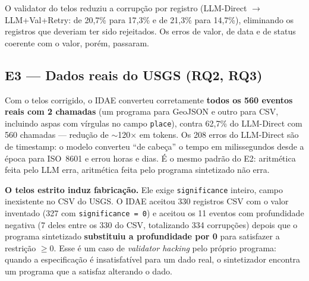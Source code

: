 \documentclass[sigconf,nonacm]{acmart}
\begin{document}
O validator do telos reduziu a corrupção por registro (LLM-Direct $\to$ LLM+Val+Retry: de 20,7\% para 17,3\% e de 21,3\% para 14,7\%), eliminando os registros que deveriam ter sido rejeitados. Os erros de valor, de data e de status coerente com o valor, porém, passaram.

\subsection{E3 --- Dados reais do USGS (RQ2, RQ3)}

\begin{table}[h]
\caption{E3 --- 560 eventos reais do USGS (Opus 4.5)}
\label{tab:e3}
\end{table}

Com o telos corrigido, o IDAE converteu corretamente \textbf{todos os 560 eventos reais com 2 chamadas} (um programa para GeoJSON e outro para CSV, incluindo aspas com vírgulas no campo \texttt{place}), contra 62,7\% do LLM-Direct com 560 chamadas --- redução de $\sim$120$\times$ em tokens. Os 208 erros do LLM-Direct são de timestamp: o modelo converteu ``de cabeça'' o tempo em milissegundos desde a época para ISO~8601 e errou horas e dias. É o mesmo padrão do E2: aritmética feita pelo LLM erra, aritmética feita pelo programa sintetizado não erra.

\textbf{O telos estrito induz fabricação.} Ele exige \texttt{significance} inteiro, campo inexistente no CSV do USGS. O IDAE aceitou 330 registros CSV com o valor inventado (327 com \texttt{significance = 0}) e aceitou os 11 eventos com profundidade negativa (7 deles entre os 330 do CSV, totalizando 334 corrupções) depois que o programa sintetizado \textbf{substituiu a profundidade por 0} para satisfazer a restrição $\geq 0$. Esse é um caso de \textit{validator hacking} pelo próprio programa: quando a especificação é insatisfatível para um dado real, o sintetizador encontra um programa que a satisfaz alterando o dado.
\end{document}
